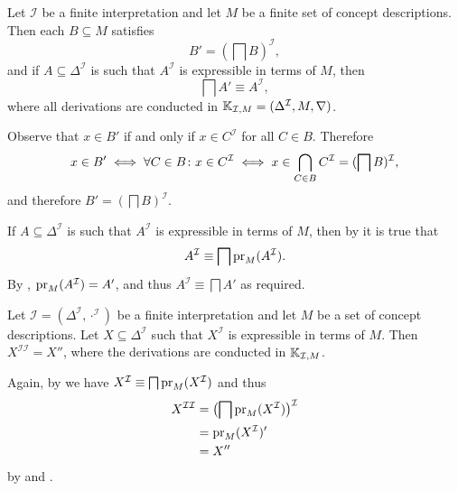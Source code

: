 \begin{Proposition}
  \label{prop:connection-I-prime-2}
  Let $\mathcal{I}$ be a finite interpretation and let $M$ be a finite set of concept
  descriptions.  Then each $B \subseteq M$ satisfies
  \begin{equation*}
    B' = (\bigsqcap B)^{\mathcal{I}},
  \end{equation*}
  and if $A \subseteq \Delta^{\mathcal{I}}$ is such that $A^{\mathcal{I}}$ is expressible
  in terms of $M$, then
  \begin{equation*}
    \bigsqcap A' \equiv A^{\mathcal{I}},
  \end{equation*}
  where all derivations are conducted in ${\mathbb{K}}_{\mathcal{I}, M} = (\Delta^{\mathcal{I}},
  M, \nabla)$.
\end{Proposition}
\begin{Proof}
  Observe that $x \in B'$ if and only if $x \in C^{\mathcal{I}}$ for all $C \in B$.
  Therefore
  \begin{equation*}
    x \in B' \iff \forall C \in B \colon x \in C^{\mathcal{I}} \iff x \in \bigcap_{C \in
      B} C^{\mathcal{I}} = (\bigsqcap B)^{\mathcal{I}},
  \end{equation*}
  and therefore $B' = (\bigsqcap B)^{\mathcal{I}}$.

  If $A \subseteq \Delta^{\mathcal{I}}$ is such that $A^{\mathcal{I}}$ is expressible in
  terms of $M$, then by  it is true that
  \begin{equation*}
    A^{\mathcal{I}} \equiv \bigsqcap \operatorname{pr}_M(A^{\mathcal{I}}).
  \end{equation*}
  By , $\operatorname{pr}_M(A^{\mathcal{I}}) = A'$, and thus
  $A^{\mathcal{I}} \equiv \bigsqcap A'$ as required.
\end{Proof}

\begin{Proposition}
  \label{prop:connection-I-prime-3}
  Let $\mathcal{I} = (\Delta^{\mathcal{I}}, \cdot^{\mathcal{I}})$ be a finite
  interpretation and let $M$ be a set of concept descriptions.  Let $X \subseteq
  \Delta^{\mathcal{I}}$ such that $X^{\mathcal{I}}$ is expressible in terms of $M$.  Then
  $X^{\mathcal{I}\mathcal{I}} = X''$, where the derivations are conducted in ${\mathbb{K}}_{\mathcal{I}, M}$.
\end{Proposition}
\begin{Proof}
  Again, by  we have $X^{\mathcal{I}}
  \equiv \bigsqcap \operatorname{pr}_M(X^{\mathcal{I}})$ and thus
  \begin{align*}
    X^{\mathcal{I}\mathcal{I}}
    &= \bigl(\bigsqcap \operatorname{pr}_M(X^{\mathcal{I}})\bigr)^{\mathcal{I}} \\
    &= \operatorname{pr}_M(X^{\mathcal{I}})' \\
    &= X''
  \end{align*}
  by  and .
\end{Proof}

